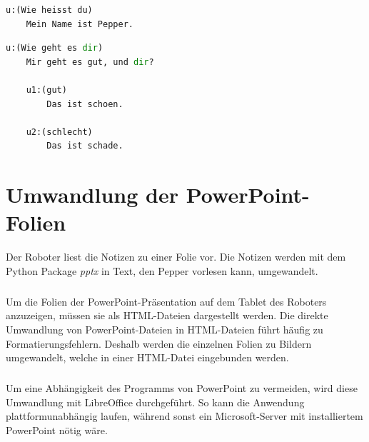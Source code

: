 \begin{lstlisting}[float, language=Python, frame=single, framexleftmargin=15pt,
style=algoBericht, label={lst:pepper-dialog}, captionpos=b, caption={Einfacher
Dialog mit Pepper}] 
u:(Wie heisst du)
	Mein Name ist Pepper.
\end{lstlisting}

\begin{lstlisting}[float, language=Python, frame=single, framexleftmargin=15pt,
style=algoBericht, label={lst:pepper-dialog-kontext}, captionpos=b,
caption={Dialog mit Pepper mit Kontext}] 
u:(Wie geht es dir)
	Mir geht es gut, und dir?
	
	u1:(gut)
		Das ist schoen.
		
	u2:(schlecht)
		Das ist schade.
\end{lstlisting}

\section{Umwandlung der PowerPoint-Folien}\label{sec:umwandlung}
Der Roboter liest die Notizen zu einer Folie vor. Die Notizen werden mit dem
Python Package \emph{pptx} in Text, den Pepper vorlesen kann, umgewandelt.

\subparagraph{}
Um die Folien der PowerPoint-Präsentation auf dem Tablet des Roboters
anzuzeigen, müssen sie als HTML-Dateien dargestellt werden. Die direkte
Umwandlung von PowerPoint-Dateien in HTML-Dateien führt häufig zu
Formatierungsfehlern. Deshalb werden die einzelnen Folien zu Bildern
umgewandelt, welche in einer HTML-Datei eingebunden werden. 

\subparagraph{}
Um eine Abhängigkeit des Programms von PowerPoint zu vermeiden, wird diese
Umwandlung mit LibreOffice durchgeführt. So kann die Anwendung
plattformunabhängig laufen, während sonst ein Microsoft-Server mit
installiertem PowerPoint nötig wäre.

